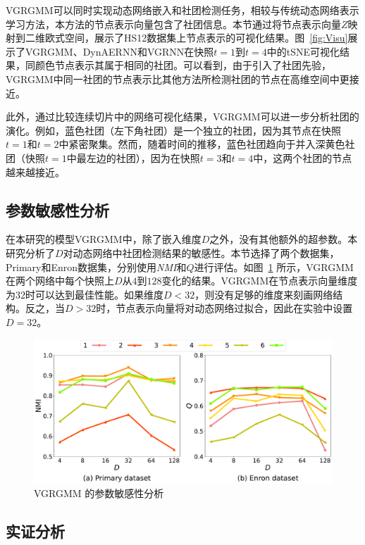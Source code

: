 VGRGMM可以同时实现动态网络嵌入和社团检测任务，相较与传统动态网络表示学习方法，本方法的节点表示向量包含了社团信息。本节通过将节点表示向量$Z$映射到二维欧式空间，展示了HS12数据集上节点表示的可视化结果。图~\ref{fig:Visu}展示了VGRGMM、DynAERNN和VGRNN在快照$t=1$到$t=4$中的tSNE可视化结果，同颜色节点表示其属于相同的社团。可以看到，由于引入了社团先验，VGRGMM中同一社团的节点表示比其他方法所检测社团的节点在高维空间中更接近。

此外，通过比较连续切片中的网络可视化结果，VGRGMM可以进一步分析社团的演化。例如，蓝色社团（左下角社团）是一个独立的社团，因为其节点在快照$t=1$和$t=2$中紧密聚集。然而，随着时间的推移，蓝色社团趋向于并入深黄色社团（快照$t=1$中最左边的社团），因为在快照$t=3$和$t=4$中，这两个社团的节点越来越接近。


\subsection{参数敏感性分析}




在本研究的模型VGRGMM中，除了嵌入维度$D$之外，没有其他额外的超参数。本研究分析了$D$对动态网络中社团检测结果的敏感性。本节选择了两个数据集，Primary和Enron数据集，分别使用\emph{NMI}和$Q$进行评估。如图~\ref{fig:Hyper} 所示，VGRGMM在两个网络中每个快照上$D$从$4$到$128$变化的结果。VGRGMM在节点表示向量维度为$32$时可以达到最佳性能。如果维度$D < 32$，则没有足够的维度来刻画网络结构。反之，当$D > 32$时，节点表示向量将对动态网络过拟合，因此在实验中设置$D = 32$。

\begin{figure}[htbp]
	\centering
	\includegraphics[width=.6\textwidth]{figures/chap06/DimensionsOndifferentData-t.pdf}
	\caption{VGRGMM 的参数敏感性分析}
	\label{fig:Hyper}
	\vspace{0cm}
\end{figure}




\subsection{实证分析}


